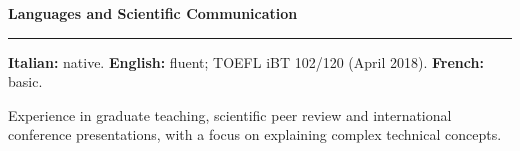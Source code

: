 \documentclass[10pt,a4paper]{article}
\newcommand{\cvsection}[1]{%
    \Needspace{4\baselineskip}%
    \vspace{0.8em}%
    {\large\bfseries\color{accent} #1}\par
    \vspace{0.2em}\hrule\vspace{0.45em}%
}
\begin{document}
    \cvsection{Languages and Scientific Communication}

    \textbf{Italian:} native.
    \hfill
    \textbf{English:} fluent; TOEFL iBT 102/120 (April 2018).
    \hfill
    \textbf{French:} basic.\par
    Experience in graduate teaching, scientific peer review and international
    conference presentations, with a focus on explaining complex technical concepts.
\end{document}
